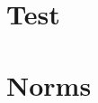 \begin{appendix}
	\chapter{Test}\label{chp:appendix:test}
	\chapter{Norms} \label{chp:appendix:norms}
		
\end{appendix}